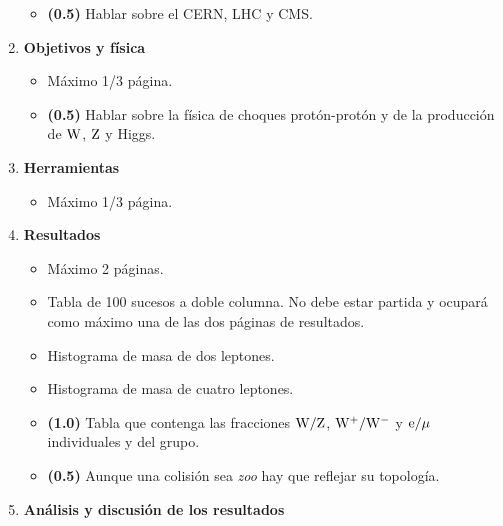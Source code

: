 \documentclass[11pt]{articulo}
\begin{document}
\begin{enumerate}
\begin{itemize}
\item {\bf (0.5)} Hablar sobre el CERN, LHC y CMS.

\end{itemize}

\item {\bf Objetivos y f\'isica}

\begin{itemize}

\item M\'aximo 1/3 p\'agina.

\item {\bf (0.5)} Hablar sobre la f\'isica de choques prot\'on-prot\'on y de la producci\'on de ${\rm W}$, ${\rm Z}$ y Higgs.

\end{itemize}

\item {\bf Herramientas}

\begin{itemize}

\item M\'aximo 1/3 p\'agina.

\end{itemize}

\item {\bf Resultados}

\begin{itemize}

\item M\'aximo 2 p\'aginas.

\item Tabla de 100 sucesos a doble columna. No debe estar partida y ocupar\'a como m\'aximo una de las dos p\'aginas de resultados.

\item Histograma de masa de dos leptones.

\item Histograma de masa de cuatro leptones.

\item {\bf (1.0)} Tabla que contenga las fracciones ${\rm W/Z}$, ${\rm W^+/W^-}$ y ${\rm e/\mu}$ individuales y del grupo.

\item {\bf (0.5)} Aunque una colisi\'on sea {\it zoo} hay que reflejar su topolog\'ia.

\end{itemize}

\newpage

\item {\bf An\'alisis y discusi\'on de los resultados}


\end{enumerate}
\end{document}
